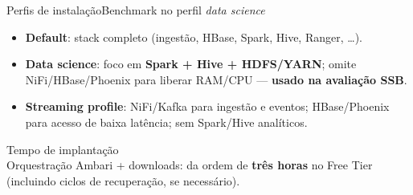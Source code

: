 \begin{frame}{Perfis de instala\c{c}\~ao}{Benchmark no perfil \textit{data science}}
  \begin{itemize}
    \item \textbf{Default}: stack completo (ingest\~ao, HBase, Spark, Hive, Ranger, \ldots).
    \item \textbf{Data science}: foco em \textbf{Spark + Hive + HDFS/YARN}; omite NiFi/HBase/Phoenix para liberar RAM/CPU --- \textbf{usado na avalia\c{c}\~ao SSB}.
    \item \textbf{Streaming profile}: NiFi/Kafka para ingest\~ao e eventos; HBase/Phoenix para acesso de baixa lat\^encia; sem Spark/Hive anal\'iticos.
  \end{itemize}
  \vspace{0.35em}
  \begin{cefetblock}{Tempo de implanta\c{c}\~ao} \\
    Orquestra\c{c}\~ao Ambari + downloads: da ordem de \textbf{tr\^es horas} no Free Tier (incluindo ciclos de recupera\c{c}\~ao, se necess\'ario).
  \end{cefetblock}
\end{frame}

